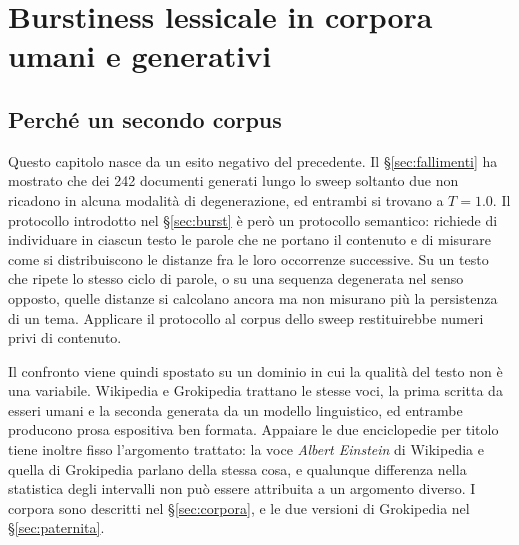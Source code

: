 %

\chapter{Burstiness lessicale in corpora umani e generativi}
\label{cap:risultati2}

\section{Perché un secondo corpus}
\label{sec:perche-wiki}

Questo capitolo nasce da un esito negativo del precedente. Il
§\ref{sec:fallimenti} ha mostrato che dei \num{242} documenti generati lungo lo
sweep soltanto due non ricadono in alcuna modalità di degenerazione, ed entrambi
si trovano a $T = 1.0$. Il protocollo introdotto nel §\ref{sec:burst} è però un
protocollo semantico: richiede di individuare in ciascun testo le parole che ne
portano il contenuto e di misurare come si distribuiscono le distanze fra le
loro occorrenze successive. Su un testo che ripete lo stesso ciclo di parole, o
su una sequenza degenerata nel senso opposto, 
quelle distanze si calcolano ancora ma non misurano più la
persistenza di un tema. Applicare il protocollo al corpus dello sweep
restituirebbe numeri privi di contenuto.

Il confronto viene quindi spostato su un dominio in cui la qualità del testo
non è una variabile. Wikipedia e Grokipedia trattano le stesse voci, la prima
scritta da esseri umani e la seconda generata da un modello linguistico, ed
entrambe producono prosa espositiva ben formata. Appaiare le due enciclopedie
per titolo tiene inoltre fisso l'argomento trattato: la voce
\emph{Albert Einstein} di Wikipedia e quella di Grokipedia parlano della stessa
cosa, e qualunque differenza nella statistica degli intervalli non può essere
attribuita a un argomento diverso. I corpora sono descritti nel §\ref{sec:corpora}, e le
due versioni di Grokipedia nel §\ref{sec:paternita}.

